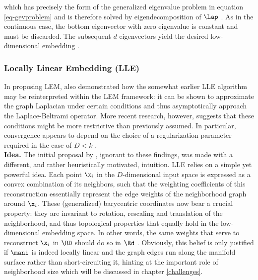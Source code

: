 which has precisely the form of the generalized eigenvalue problem in equation
\ref{eq-gevproblem} and is therefore solved by eigendecomposition of $\Lap$ \citep{belkinniyogi2003}.
As in the continuous case, the bottom eigenvector with zero eigenvalue is
constant and must be discarded.
The subsequent $d$ eigenvectors yield the desired low-dimensional
embedding \citep{levy2006}.


\subsubsection{Locally Linear Embedding (LLE)}
\label{lle}

In proposing LEM, \citet{belkinniyogi2003} also demonstrated how the somewhat 
earlier LLE algorithm may be reinterpreted within the LEM framework: it can be 
shown to approximate the graph Laplacian under certain conditions and thus 
asymptotically approach the Laplace-Beltrami operator.
More recent research, however, suggests that these conditions might be more 
restrictive than previously assumed. 
In particular, convergence appears to depend on the choice of a regularization 
parameter required in the case of $D < k$ \citep{wuwu2018}.
\\

\textbf{Idea.}
The initial proposal by \citet{roweissaul2000}, ignorant to these findings, 
was made with a different, and rather heuristically motivated, intuition.
LLE relies on a simple yet powerful idea.
Each point $\x_i$ in the $D$-dimensional input space is expressed as a convex 
combination of its neighbors, such that the weighting coefficients of this 
reconstruction essentially represent the edge weights of the neighborhood graph 
around $\x_i$. 
These (generalized) barycentric coordinates now bear a crucial property: they 
are invariant to rotation, rescaling and translation of the neighborhood, and 
thus topological properties that equally hold in the low-dimensional embedding 
space. 
In other words, the same weights that serve to reconstruct $\x_i$ in $\RD$ 
should do so in $\Rd$ \citep{roweissaul2000}.
Obviously, this belief is only justified if $\mani$ is indeed locally linear and 
the graph edges run along the manifold surface rather than short-circuiting it, 
hinting at the important role of neighborhood size which will be discussed 
in chapter \ref{challenges}.

